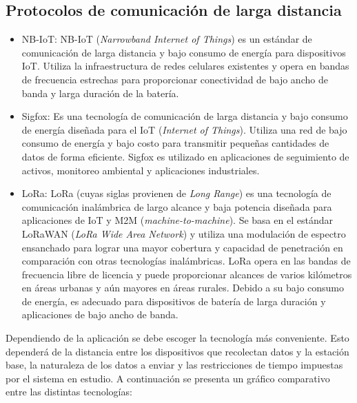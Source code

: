 \subsection{Protocolos de comunicación de larga distancia}

\begin{itemize}

    \item NB-IoT: NB-IoT (\textit{Narrowband Internet of Things}) es un estándar de comunicación de larga distancia y bajo consumo de energía para dispositivos IoT. Utiliza la infraestructura de redes celulares existentes y opera en bandas de frecuencia estrechas para proporcionar conectividad de bajo ancho de banda y larga duración de la batería.
    \item Sigfox: Es una tecnología de comunicación de larga distancia y bajo consumo de energía diseñada para el IoT (\textit{Internet of Things}). Utiliza una red de bajo consumo de energía y bajo costo para transmitir pequeñas cantidades de datos de forma eficiente. Sigfox es utilizado en aplicaciones de seguimiento de activos, monitoreo ambiental y aplicaciones industriales. 
    \item LoRa: LoRa (cuyas siglas provienen de \textit{Long Range}) es una tecnología de comunicación inalámbrica de largo alcance y baja potencia diseñada para aplicaciones de IoT y M2M (\textit{machine-to-machine}). Se basa en el estándar LoRaWAN (\textit{LoRa Wide Area Network}) y utiliza una modulación de espectro ensanchado para lograr una mayor cobertura y capacidad de penetración en comparación con otras tecnologías inalámbricas. LoRa opera en las bandas de frecuencia libre de licencia y puede proporcionar alcances de varios kilómetros en áreas urbanas y aún mayores en áreas rurales. Debido a su bajo consumo de energía, es adecuado para dispositivos de batería de larga duración y aplicaciones de bajo ancho de banda.
\end{itemize}

Dependiendo de la aplicación se debe escoger la tecnología más conveniente. Esto dependerá de la distancia entre los dispositivos que recolectan datos y la estación base, la naturaleza de los datos a enviar y las restricciones de tiempo impuestas por el sistema en estudio. A continuación se presenta un gráfico comparativo entre las distintas tecnologías:

